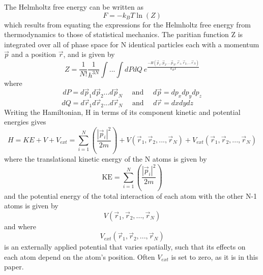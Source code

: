\documentclass[double,12pt]{beavtex}
\begin{document}
The Helmholtz free energy can be written as
\begin{equation}{F=-k_{B}T\ln(Z)}\end{equation}
which results from equating the expressions for the Helmholtz free energy 
from thermodynamics to those of statistical mechanics. The paritian function 
Z is integrated over all of phase space for N identical particles each with 
a momentum $\vec{p}$ and a position $\vec{r}$, and is given by
\begin{equation}{Z=}\frac{1}{N!}\frac{1}{h^{3N}}\int{...}\int{dPdQ}~e^\frac{-H(\vec{p}_1,\vec{p}_2,...\vec{p}_N,\vec{r}_1, \vec{r}_2,...\vec{r}_N)}{k_BT}\end{equation}
where
\begin{displaymath}{dP=d\vec{p}_1d\vec{p}_2...d\vec{p}_N \mbox{~~~~and~~~~} d\vec{p}=dp_xdp_ydp_z}\end{displaymath}
\begin{displaymath}{dQ=d\vec{r}_1d\vec{r}_2...d\vec{r}_N \mbox{~~~~and~~~~} d\vec{r}=dxdydz\mbox{~~~~}}\end{displaymath}
Writing the Hamiltonian, H in terms of its component kinetic and potential energies gives
\begin{equation}{H = KE + V + V_{ext} = \sum_{i=1}^N\left(\frac{|\vec{p}_i|^2}{2m}\right)+V(\vec{r}_1,\vec{r}_2,{...},\vec{r}_N)+V_{ext}(\vec{r}_1,\vec{r}_2,{...},\vec{r}_N)}\end{equation}
where the translational kinetic energy of the N atoms is given by 
\begin{equation}{\text{KE}=\sum_{i=1}^N\left(\frac{|\vec{p}_i|^2}{2m}\right)}\end{equation}
and the potential energy of the total interaction of each atom with the other 
N-1 atoms is given by
\begin{displaymath}{V(\vec{r}_1,\vec{r}_2,{...},\vec{r}_N)}\end{displaymath} 
and where \begin{displaymath}{V_{ext}(\vec{r}_1,\vec{r}_2,{...},\vec{r}_N)}\end{displaymath} 
is an externally applied potential that varies spatially, such that its 
effects on each atom depend on the atom's position. Often $V_{ext}$ is 
set to zero, as it is in this paper. 
\end{document}
